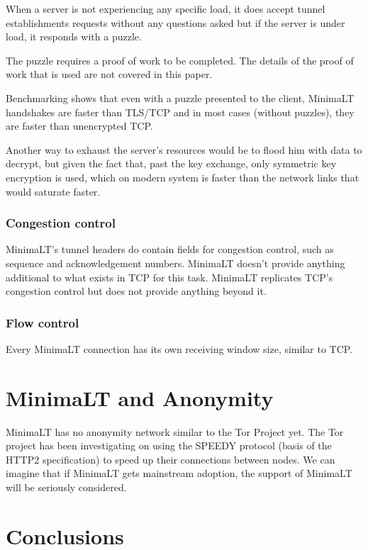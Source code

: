 \documentclass{vldb}
\begin{document}
When a server is not experiencing any specific load, it does accept tunnel establishments requests without any questions asked but if the server is under load, it responds with a puzzle.

The puzzle requires a proof of work to be completed. The details of the proof of work that is used are not covered in this paper.

Benchmarking shows that even with a puzzle presented to the client, MinimaLT handshakes are faster than TLS/TCP and in most cases (without puzzles), they are faster than unencrypted TCP.\cite{MinimaLT}

Another way to exhaust the server's resources would be to flood him with data to decrypt, but given the fact that, past the key exchange, only symmetric key encryption is used, which on modern system is faster than the network links that would saturate faster.

\subsubsection{Congestion control}

MinimaLT's tunnel headers do contain fields for congestion control, such as sequence and acknowledgement numbers. MinimaLT doesn't provide anything additional to what exists in TCP for this task. MinimaLT replicates TCP's congestion control but does not provide anything beyond it.

\subsubsection{Flow control}

Every MinimaLT connection has its own receiving window size, similar to TCP. 

\section{MinimaLT and Anonymity}

MinimaLT has no anonymity network similar to the Tor Project yet. The Tor project has been investigating on using the SPEEDY protocol (basis of the HTTP2 specification) to speed up their connections between nodes. We can imagine that if MinimaLT gets mainstream adoption, the support of MinimaLT will be seriously considered.

\section{Conclusions}
\end{document}

